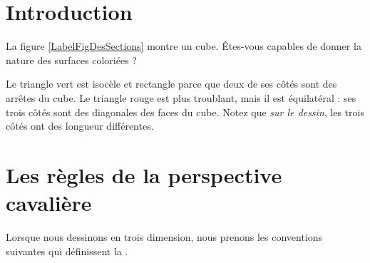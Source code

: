
\section{Introduction}

La figure \ref{LabelFigDesSections} montre un cube. Êtes-vous capables de donner la nature des surfaces coloriées ?
\newcommand{\CaptionFigDesSections}{Exercice de vision dans l'espace.}

Le triangle vert est isocèle et rectangle parce que deux de ses côtés sont des arrêtes du cube. Le triangle rouge est plus troublant, mais il est équilatéral : ses trois côtés sont des diagonales des faces du cube. Notez que \emph{sur le dessin}, les trois côtés ont des longueur différentes.

\section{Les règles de la perspective cavalière}

Lorsque nous dessinons en trois dimension, nous prenons les conventions suivantes qui définissent la .

